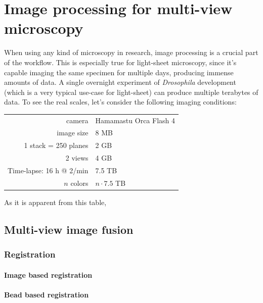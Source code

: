 

\chapter{Image processing for multi-view microscopy}
  \graphicspath{{./figures/3_processing/}}

  When using any kind of microscopy in research, image processing is a crucial part of the workflow. This is especially true for light-sheet microscopy, since it's capable imaging the same specimen for multiple days, producing immense amounts of data. A single overnight experiment of \textit{Drosophila} development (which is a very typical use-case for light-sheet) can produce multiple terabytes of data. To see the real scales, let's consider the following imaging conditions:
  \begin{center}
  \begin{tabular}{rl}
      camera & Hamamastu Orca Flash 4 \\
      image size & 8 MB \\
      1 stack = 250 planes & 2 GB \\
      2 views & 4 GB \\
      Time-lapse: 16 h @ 2/min & 7.5 TB \\
      $n$ colors & $n\cdot 7.5$ TB
  \end{tabular}
  \end{center}

  As it is apparent from this table, 

\section{Multi-view image fusion}
  \subsection{Registration}
    \subsubsection{Image based registration}
    \subsubsection{Bead based registration}
